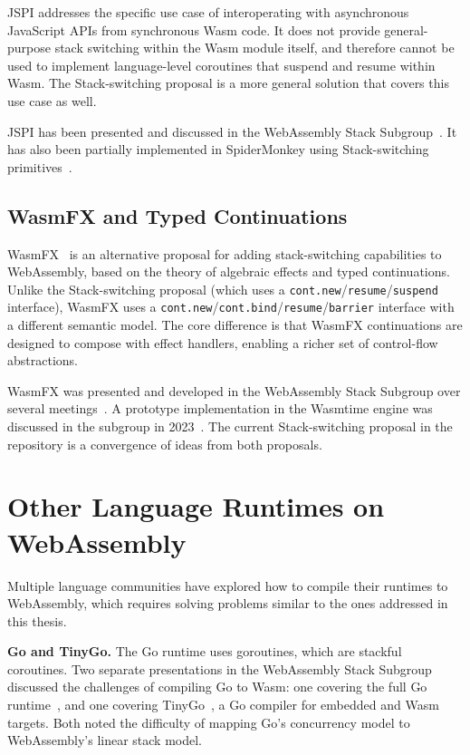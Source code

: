 JSPI addresses the specific use case of interoperating with asynchronous JavaScript APIs from synchronous
Wasm code. It does not provide general-purpose stack switching within the Wasm module itself, and therefore
cannot be used to implement language-level coroutines that suspend and resume within Wasm. The Stack-switching
proposal is a more general solution that covers this use case as well.

JSPI has been presented and discussed in the WebAssembly Stack Subgroup~\cite{jspi-wasm-meeting}. It has also
been partially implemented in SpiderMonkey using Stack-switching primitives~\cite{spidermonkey-stack-switching-diff}.

\subsection{WasmFX and Typed Continuations}

WasmFX~\cite{wasmfx-proposal} is an alternative proposal for adding stack-switching capabilities to
WebAssembly, based on the theory of algebraic effects and typed continuations.
Unlike the Stack-switching proposal (which uses a \texttt{cont.new}/\texttt{resume}/\texttt{suspend}
interface), WasmFX uses a \texttt{cont.new}/\texttt{cont.bind}/\texttt{resume}/\texttt{barrier}
interface with a different semantic model. The core difference is that WasmFX continuations are
designed to compose with effect handlers, enabling a richer set of control-flow abstractions.

WasmFX was presented and developed in the WebAssembly Stack Subgroup over several meetings~\cite{wasmfx-meeting-2021,wasmfx-meeting-2023}.
A prototype implementation in the Wasmtime engine was discussed in the subgroup in 2023~\cite{wasmfx-wasmtime-2023}.
The current Stack-switching proposal in the repository is a convergence of ideas from both proposals.

\section{Other Language Runtimes on WebAssembly}

Multiple language communities have explored how to compile their runtimes to WebAssembly, which requires
solving problems similar to the ones addressed in this thesis.

\textbf{Go and TinyGo.} The Go runtime uses goroutines, which are stackful coroutines. Two separate presentations
in the WebAssembly Stack Subgroup discussed the challenges of compiling Go to Wasm: one covering the full
Go runtime~\cite{go-wasm-meeting}, and one covering TinyGo~\cite{tinygo-wasm-meeting}, a Go compiler for
embedded and Wasm targets. Both noted the difficulty of mapping Go's concurrency model to WebAssembly's
linear stack model.

